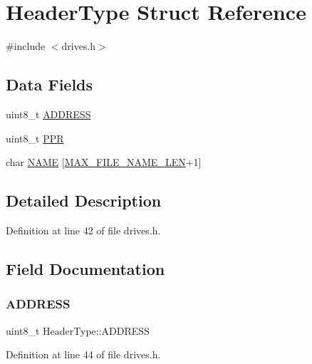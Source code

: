 \hypertarget{structHeaderType}{}\section{Header\+Type Struct Reference}
\label{structHeaderType}


{\ttfamily \#include $<$drives.\+h$>$}

\subsection*{Data Fields}
\begin{DoxyCompactItemize}
\item 
uint8\+\_\+t \hyperlink{structHeaderType_a70edfd477c537b2fa51c1aa63fcc7bee}{A\+D\+D\+R\+E\+SS}
\item 
uint8\+\_\+t \hyperlink{structHeaderType_ac642cdad0f3874495afa0ab687a56fd0}{P\+PR}
\item 
char \hyperlink{structHeaderType_aac997fd2dc536b10072137ecaf1fd0b4}{N\+A\+ME} \mbox{[}\hyperlink{drives_8h_a835262f9c26026aab5f91a528f57ad8f}{M\+A\+X\+\_\+\+F\+I\+L\+E\+\_\+\+N\+A\+M\+E\+\_\+\+L\+EN}+1\mbox{]}
\end{DoxyCompactItemize}


\subsection{Detailed Description}


Definition at line 42 of file drives.\+h.



\subsection{Field Documentation}
\mbox{\label{structHeaderType_a70edfd477c537b2fa51c1aa63fcc7bee}} 
\subsubsection{\texorpdfstring{A\+D\+D\+R\+E\+SS}{ADDRESS}}
{\footnotesize\ttfamily uint8\+\_\+t Header\+Type\+::\+A\+D\+D\+R\+E\+SS}



Definition at line 44 of file drives.\+h.



